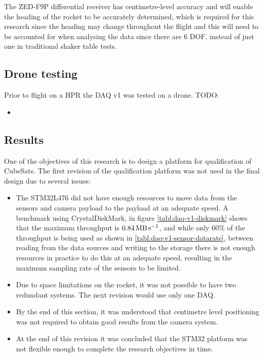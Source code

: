 \documentclass[a4paper,11pt]{article}
\begin{document}
The ZED-F9P differential receiver has centimetre-level accuracy and will enable the heading of the rocket to be accurately determined, which is required for this research since the heading may change throughout the flight and this will need to be accounted for when analysing the data since there are 6 DOF, instead of just one in traditional shaker table tests.

\subsection{Drone testing}
Prior to flight on a HPR the DAQ v1 was tested on a drone. 
TODO:

\begin{itemize}
  \item 
\end{itemize}

\subsection{Results}

One of the objectives of this research is to design a platform for qualification of CubeSats. The first revision of the qualification platform was not used in the final design due to several issues:

\begin{itemize}
  \item The STM32L476 did not have enough resources to move data from the sensors and camera payload to the payload at an adequate speed. A benchmark using CrystalDiskMark, in figure \ref{tabl:daq-v1-diskmark} shows that the maximum throughput is $\SI{0.84}{\mega\byte\per\second}$, and while only 60\% of the throughput is being used as shown in \ref{tabl:daq-v1-sensor-datarate}, between reading from the data sources and writing to the storage there is not enough resources in practice to do this at an adequate speed, resulting in the maximum sampling rate of the sensors to be limited.
  \item Due to space limitations on the rocket, it was not possible to have two redundant systems. The next revision would use only one DAQ.
  \item By the end of this section, it was understood that centimetre level positioning was not required to obtain good results from the camera system.
  \item At the end of this revision it was concluded that the STM32 platform was not flexible enough to complete the research objectives in time.
\end{itemize}
\end{document}

